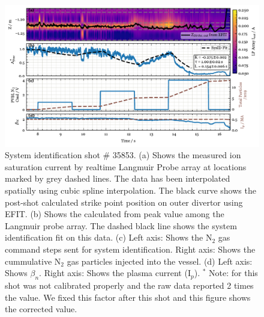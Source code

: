 




\begin{figure}[!ht]
 \centering
 \includegraphics[width=\textwidth]{figures/DetCtrl_2D_35853.pdf}
 \caption{System identification shot \# 35853.
(a) Shows the measured ion saturation current by realtime Langmuir Probe array at locations marked by grey dashed lines.
The data has been interpolated spatially using cubic spline interpolation.
The black curve shows the post-shot calculated strike point position on outer divertor using EFIT.
(b) Shows the \Afrac calculated from peak value among the Langmuir probe array.
The dashed black line shows the system identification fit on this data.
(c) Left axis: Shows the N$_2$ gas command steps sent for system identification.
Right axis: Shows the cummulative N$_2$ gas particles injected into the vessel.
(d) Left axis: Shows $\beta_n$.
Right axis: Shows the plasma current (I$_p$).
$^*$ Note: \Afrac for this shot was not calibrated properly and the raw data reported 2 times the value.
We fixed this factor after this shot and this figure shows the corrected value.
}
 \label{fig:sysid_afrac}
\end{figure}

